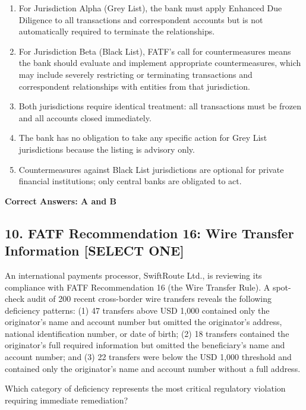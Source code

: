\documentclass[11pt,a4paper]{article}
\begin{document}
	\begin{enumerate}[label=\Alph*.]
		\item For Jurisdiction Alpha (Grey List), the bank must apply Enhanced Due Diligence to all transactions and correspondent accounts but is not automatically required to terminate the relationships.
		\item For Jurisdiction Beta (Black List), FATF's call for countermeasures means the bank should evaluate and implement appropriate countermeasures, which may include severely restricting or terminating transactions and correspondent relationships with entities from that jurisdiction.
		\item Both jurisdictions require identical treatment: all transactions must be frozen and all accounts closed immediately.
		\item The bank has no obligation to take any specific action for Grey List jurisdictions because the listing is advisory only.
		\item Countermeasures against Black List jurisdictions are optional for private financial institutions; only central banks are obligated to act.
	\end{enumerate}
	\textbf{Correct Answers: A and B}
	
	\subsection{10. FATF Recommendation 16: Wire Transfer Information \textnormal{[SELECT ONE]}}
	
	An international payments processor, SwiftRoute Ltd., is reviewing its compliance with FATF Recommendation 16 (the Wire Transfer Rule). A spot-check audit of 200 recent cross-border wire transfers reveals the following deficiency patterns: (1) 47 transfers above USD 1,000 contained only the originator's name and account number but omitted the originator's address, national identification number, or date of birth; (2) 18 transfers contained the originator's full required information but omitted the beneficiary's name and account number; and (3) 22 transfers were below the USD 1,000 threshold and contained only the originator's name and account number without a full address.
	
	Which category of deficiency represents the most critical regulatory violation requiring immediate remediation?
	
\end{document}
